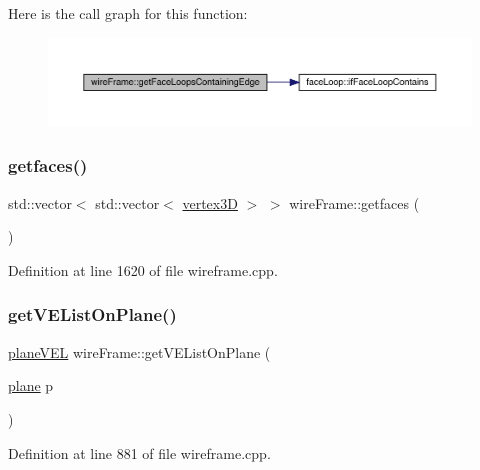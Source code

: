 Here is the call graph for this function\+:
\nopagebreak
\begin{figure}[H]
\begin{center}
\leavevmode
\includegraphics[width=350pt]{classwire_frame_aff23ae34c3bab0a3a4b6967e4b955ecb_cgraph}
\end{center}
\end{figure}
\mbox{\label{classwire_frame_a1abdffd7d1d696252685617b63a4126c}} 
\subsubsection{\texorpdfstring{getfaces()}{getfaces()}}
{\footnotesize\ttfamily std\+::vector$<$ std\+::vector$<$ \mbox{\hyperlink{structvertex3_d}{vertex3D}} $>$ $>$ wire\+Frame\+::getfaces (\begin{DoxyParamCaption}{ }\end{DoxyParamCaption})}



Definition at line 1620 of file wireframe.\+cpp.

\mbox{\label{classwire_frame_acdcde71a2d420de040065d6db4ad334d}} 
\subsubsection{\texorpdfstring{get\+V\+E\+List\+On\+Plane()}{getVEListOnPlane()}}
{\footnotesize\ttfamily \mbox{\hyperlink{structplane_v_e_l}{plane\+V\+EL}} wire\+Frame\+::get\+V\+E\+List\+On\+Plane (\begin{DoxyParamCaption}\item[{\mbox{\hyperlink{structplane}{plane}}}]{p }\end{DoxyParamCaption})}



Definition at line 881 of file wireframe.\+cpp.

